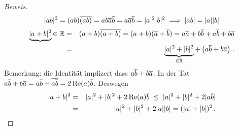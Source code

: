 \begin{proof}[Beweis]
  \begin{equation*}
    \mathopen| ab \mathclose|^2=(ab)\overline{(ab)}=ab\overline{a}\overline{b}=a\overline{a}\overline{b}=\mathopen| a \mathclose|^2\mathopen| b \mathclose|^2\\
    \implies \mathopen| ab \mathclose|=\mathopen| a \mathclose|\mathopen| b \mathclose|
  \end{equation*}
\begin{eqnarray}
\underbrace{|a+b|^2}{\in \mathbb{R}} &=& (a+b)\overline{(a+b)} = 
    (a+b)(\overline{a}+\overline{b})=a\overline{a}+b\overline{b}+a\overline{b}+b\overline{a} \nonumber\\
&=& \underbrace{\mathopen| a \mathclose|^2+\mathopen| b \mathclose|^2}_{\in\mathbb{R}}+\left( a\overline{b}+b\overline{a} \right)\, .\label{e:10}
\end{eqnarray}
Bemerkung: die Identit\"at implizert dass $a\overline{b}+b\overline{a}$. In der Tat
$a\overline{b} + b\overline{a}= a\overline{b}+ \overline{a\overline{b}} = 2 \operatorname{Re}(a) \overline{b}$. Deswegen
\begin{eqnarray}
|a+b|^2 &=& |a|^2 +|b|^2 + 2 \operatorname{Re}(a)\overline{b} \;\leq\; |a|^2+|b|^2+ 2|a \overline{b}|\nonumber\\
&=& |a|^2 + |b|^2 + 2 |a||b| = (|a|+|b|)^2\, .
\end{eqnarray}
\end{proof}

